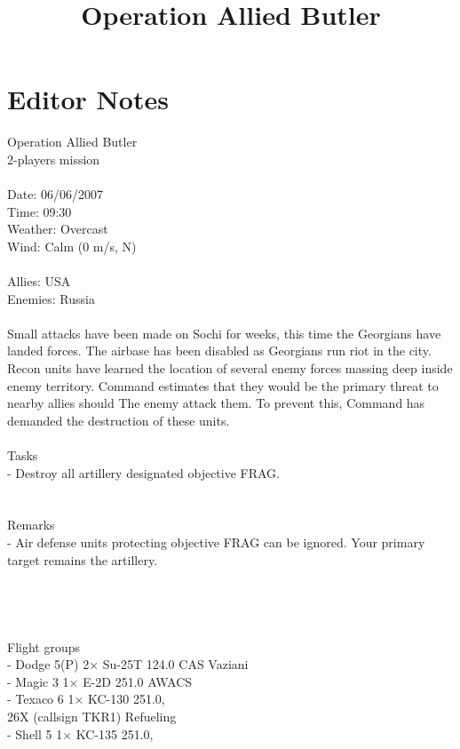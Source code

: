 \documentclass{article}
\title{Operation Allied Butler}
\begin{document}
                    \maketitle

                    \section{Editor Notes}
                    Operation Allied Butler\\
2-players mission\\
\\
Date: 06/06/2007\\
Time: 09:30\\
Weather: Overcast\\
Wind: Calm (0 m/s, N)\\
\\
Allies: USA\\
Enemies: Russia\\
\\
Small attacks have been made on Sochi for weeks, this time the Georgians have landed forces. The airbase has been disabled as Georgians run riot in the city. Recon units have learned the location of several enemy forces massing deep inside enemy territory. Command estimates that they would be the primary threat to nearby allies should The enemy attack them. To prevent this, Command has demanded the destruction of these units.\\
\\
Tasks\\
- Destroy all artillery designated objective FRAG.\\
\\
\\
Remarks\\
- Air defense units protecting objective FRAG can be ignored. Your primary target remains the artillery.\\
\\
\\
\\
\\
Flight groups\\
- Dodge 5(P)    2× Su-25T    124.0    CAS    Vaziani\\
- Magic 3    1× E-2D    251.0    AWACS\\
- Texaco 6    1× KC-130    251.0,\\
26X (callsign TKR1)    Refueling\\
- Shell 5    1× KC-135    251.0,\\
\end{document}
